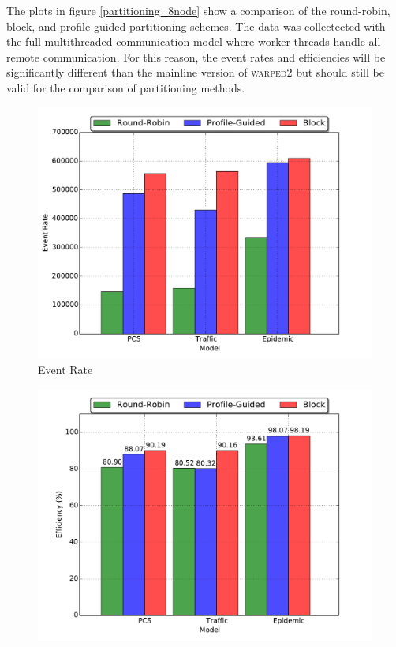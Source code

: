\documentclass[11pt]{book}
\begin{document}
The plots in figure \ref{partitioning_8node} show a comparison of the round-robin, block, and
profile-guided partitioning schemes.  The data was collectected with the full multithreaded
communication model where worker threads handle all remote communication.  For this reason, the
event rates and efficiencies will be significantly different than the mainline version of
\textsc{warped2} but should still be valid for the comparison of partitioning methods.

\begin{figure}
  \begin{minipage}{.5\textwidth}
    \begin{center}
      \includegraphics[width=\textwidth,keepaspectratio,quiet]{figs/partitioning_communication/partitioning_eventrate_8node.pdf} \\
      Event Rate \\
    \end{center}
  \end{minipage}%
  \hfill
  \begin{minipage}{.5\textwidth}
    \begin{center}
      \includegraphics[width=\textwidth,keepaspectratio,quiet]{figs/partitioning_communication/partitioning_efficiency_8node.pdf} \\

\end{center}
\end{minipage}
\end{figure}
\end{document}
